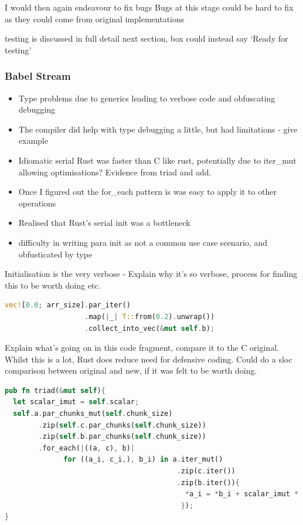 I would then again endeavour to fix bugs Bugs at this stage could be hard to fix as they could come from original implementations

testing is discussed in full detail next section, box could instead say `Ready for testing'

\subsubsection{Babel Stream}
\begin{itemize}
  \item Type problems due to generics leading to verbose code and obfuscating debugging
  \item The compiler did help with type debugging a little, but had limitations - give example
  \item Idiomatic serial Rust was faster than C like rust, potentially due to iter\_mut allowing optimisations? Evidence from triad and add.
  \item Once I figured out the for\_each pattern is was easy to apply it to other operations
  \item Realised that Rust's serial init was a bottleneck
  \item difficulty in writing para init as not a common use case scenario, and obfusticated by type
\end{itemize}

Initialisation is the very verbose - Explain why it's so verbose, process for finding this to be worth doing etc.
\begin{lstlisting}[language=Rust]
vec![0.0; arr_size].par_iter()
                   .map(|_| T::from(0.2).unwrap())
                   .collect_into_vec(&mut self.b);
\end{lstlisting}

Explain what's going on in this code fragment, compare it to the C original. Whilst this is a lot, Rust does reduce need for defensive coding. Could do a sloc comparison between original and new, if it was felt to be worth doing.

\begin{lstlisting}[language=Rust]
pub fn triad(&mut self){
  let scalar_imut = self.scalar;
  self.a.par_chunks_mut(self.chunk_size)
        .zip(self.c.par_chunks(self.chunk_size))
        .zip(self.b.par_chunks(self.chunk_size))
        .for_each(|((a, c), b)|
              for ((a_i, c_i,), b_i) in a.iter_mut()
                                         .zip(c.iter())
                                         .zip(b.iter()){
                                           *a_i = *b_i + scalar_imut * *c_i
                                          });
}
\end{lstlisting}

